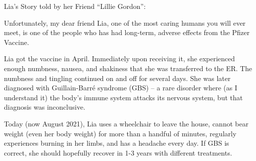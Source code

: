 Lia’s Story told by her Friend “Lillie Gordon”:

Unfortunately, my dear friend Lia, one of the most caring humans you will ever
meet, is one of the people who has had long-term, adverse effects from the
Pfizer Vaccine.

Lia got the vaccine in April. Immediately upon receiving it, she experienced
enough numbness, nausea, and shakiness that she was transferred to the ER. The
numbness and tingling continued on and off for several days. She was later
diagnosed with Guillain-Barré syndrome (GBS) – a rare disorder where (as I
understand it) the body’s immune system attacks its nervous system, but that
diagnosis was inconclusive.

Today (now August 2021), Lia uses a wheelchair to leave the house, cannot bear
weight (even her body weight) for more than a handful of minutes, regularly
experiences burning in her limbs, and has a headache every day. If GBS is
correct, she should hopefully recover in 1-3 years with different treatments.

